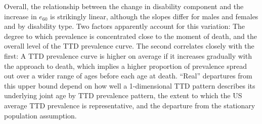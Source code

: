 \documentclass[12pt,oneside,letterpaper,doublespacing]{article}  %
\begin{document}
Overall, the relationship between the change in disability component and the
increase in $e_{60}$ is strikingly linear, although the slopes differ for males
and females and by disability type. %
Two factors apparently account for this variation: The degree to which prevalence is concentrated close to the moment of death, and the overall level of the TTD prevalence curve. The second correlates closely with the first: A TTD prevalence curve is higher on average if it increases gradually with the approach to death, which implies a higher proportion of prevalence spread out over a wider range of ages before each age at death. ``Real'' departures from this upper bound depend on
how well a 1-dimensional TTD pattern describes its underlying joint age by TTD prevalence pattern, the extent to which the US average TTD prevalence is representative, and the departure from the stationary population assumption.
\end{document}
